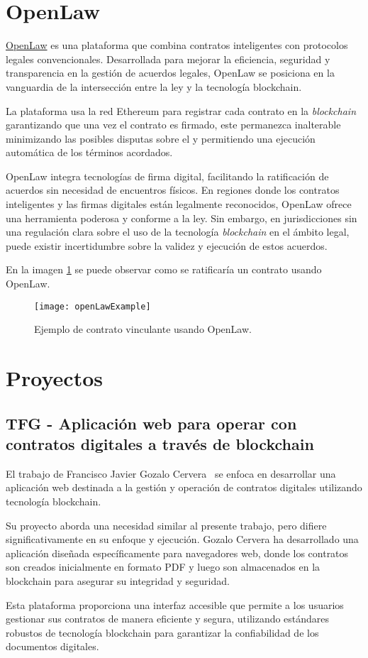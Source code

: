 
\section{OpenLaw}

\href{https://www.openlaw.io/}{OpenLaw} es una plataforma que combina contratos inteligentes con protocolos legales convencionales.
Desarrollada para mejorar la eficiencia, seguridad y transparencia en la gestión de acuerdos legales, OpenLaw se posiciona en la vanguardia de la intersección entre la ley y la tecnología blockchain.

La plataforma usa la red Ethereum para registrar cada contrato  en la \textit{blockchain} garantizando que una vez el contrato es firmado, este permanezca inalterable minimizando las posibles disputas sobre el y permitiendo una ejecución automática de los términos acordados.

OpenLaw integra tecnologías de firma digital, facilitando la ratificación de acuerdos sin necesidad de encuentros físicos.
En regiones donde los contratos inteligentes y las firmas digitales están legalmente reconocidos, OpenLaw ofrece una herramienta poderosa y conforme a la ley. Sin embargo, en jurisdicciones sin una regulación clara sobre el uso de la tecnología \textit{blockchain} en el ámbito legal, puede existir incertidumbre sobre la validez y ejecución de estos acuerdos.

En la imagen \ref{img:openLawExample} se puede observar como se ratificaría un contrato usando OpenLaw.

\begin{figure}[h]
	\label{img:openLawExample}
	\centering
	\texttt{[image: openLawExample]}
	\caption[Ejemplo OpenLaw]{Ejemplo de contrato vinculante usando OpenLaw.}
\end{figure}

\section{Proyectos}

\subsection{TFG - Aplicación web para operar con contratos digitales a través
de blockchain}

El trabajo de Francisco Javier Gozalo Cervera~\cite{tfgSmartContacts} se enfoca en desarrollar una aplicación web destinada a la gestión y operación de contratos digitales utilizando tecnología blockchain.

Su proyecto aborda una necesidad similar al presente trabajo, pero difiere significativamente en su enfoque y ejecución. Gozalo Cervera ha desarrollado una aplicación diseñada específicamente para navegadores web, donde los contratos son creados inicialmente en formato PDF y luego son almacenados en la blockchain para asegurar su integridad y seguridad.

Esta plataforma proporciona una interfaz accesible que permite a los usuarios gestionar sus contratos de manera eficiente y segura, utilizando estándares robustos de tecnología blockchain para garantizar la confiabilidad de los documentos digitales.